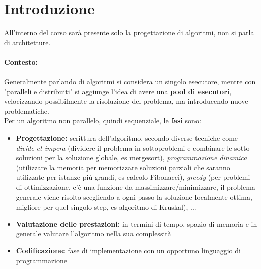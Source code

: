 \documentclass[11pt]{article}
\begin{document}
	\initcurrdate
	\maketitle 									%
	\newcommand{\nn}{\hfill \\}
	\newcommand{\RNum}[1]{\uppercase\expandafter{\romannumeral #1\relax}} 		%
	
	\tableofcontents
	
	\newpage

	\section*{Introduzione}
	All'interno del corso sarà presente solo la progettazione di algoritmi, non si parla di architetture.\\
	
	\paragraph{Contesto:} Generalmente parlando di algoritmi si considera un singolo esecutore, mentre con "paralleli e distribuiti" si aggiunge l'idea di avere una \textbf{pool di esecutori}, velocizzando possibilmente la risoluzione del problema, ma introducendo nuove problematiche. \\
	Per un algoritmo non parallelo, quindi sequenziale, le \textbf{fasi} sono: 
	\begin{itemize}
		\item \textbf{Progettazione:} scrittura dell'algoritmo, secondo diverse tecniche come \textit{divide et impera} (dividere il problema in sottoproblemi e combinare le sotto-soluzioni per la soluzione globale, es mergesort), \textit{programmazione dinamica} (utilizzare la memoria per memorizzare soluzioni parziali che saranno utilizzate per istanze più grandi, es calcolo Fibonacci), \textit{greedy} (per problemi di ottimizzazione, c'è una funzione da massimizzare/minimizzare, il problema generale viene risolto scegliendo a ogni passo la soluzione localmente ottima, migliore per quel singolo step, es algoritmo di Kruskal), ...
		
		\item \textbf{Valutazione delle prestazioni:} in termini di tempo, spazio di memoria e in generale valutare l'algoritmo nella sua complessità
		
		\item \textbf{Codificazione:} fase di implementazione con un opportuno linguaggio di programmazione
	\end{itemize}
	
\end{document}
